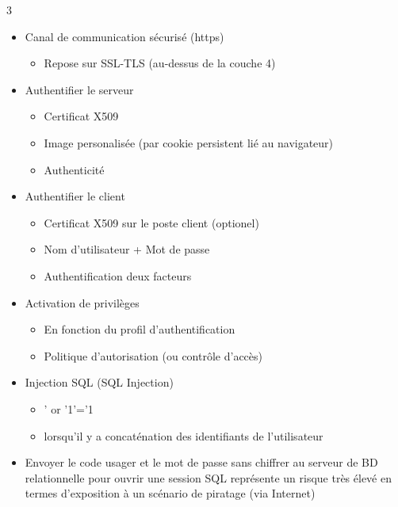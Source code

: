 \documentclass[9pt, a4paper, twoside]{article}
\begin{document}
\begin{multicols}{3}
\begin{itemize}[label=$\bullet$]
    \item \scriptsize Canal de communication sécurisé (https)
    \begin{itemize}[label={}]
        \item \scriptsize Repose sur SSL-TLS (au-dessus de la couche 4)
    \end{itemize}
    \item \scriptsize Authentifier le serveur
    \begin{itemize}[label={}]
        \item \scriptsize Certificat X509
        \item \scriptsize Image personalisée (par cookie persistent lié au navigateur)
        \item \scriptsize Authenticité
    \end{itemize}
    \item \scriptsize Authentifier le client
    \begin{itemize}[label={}]
        \item \scriptsize Certificat X509 sur le poste client (optionel)
        \item \scriptsize Nom d'utilisateur + Mot de passe
        \item \scriptsize Authentification deux facteurs
    \end{itemize}
    \item \scriptsize Activation de privilèges
    \begin{itemize}[label={}]
        \item \scriptsize En fonction du profil d'authentification
        \item \scriptsize Politique d'autorisation (ou contrôle d'accès)
    \end{itemize}
    \item \scriptsize Injection SQL (SQL Injection)
    \begin{itemize}[label={}]
        \item \scriptsize ' or '1'='1
        \item \scriptsize lorsqu'il y a concaténation des identifiants de l'utilisateur
    \end{itemize}
    \item \scriptsize Envoyer le code usager et le mot de passe sans chiffrer au serveur de BD relationnelle pour ouvrir une session SQL représente un risque très élevé en termes d'exposition à un scénario de piratage (via Internet) 
\end{itemize}


\end{multicols}
\end{document}
